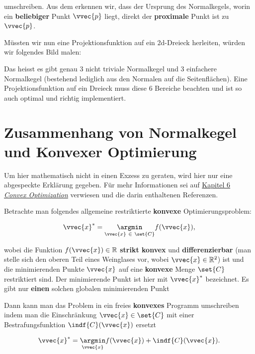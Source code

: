 \documentclass[
  12pt,
  a4paper,
  twoside,
  titlepage,
  openright,
  numbers=noenddot,
  chapterprefix=true,
  headings=optiontohead,
  svgnames,
  dvipsnames]{scrreprt}
\begin{document}
umschreiben. Aus dem erkennen wir, dass der Ursprung des Normalkegels,
worin ein \textbf{beliebiger} Punkt \(\vvec{p}\) liegt, direkt der
\textbf{proximale} Punkt ist zu \(\vvec{p}\).

Müssten wir nun eine Projektionsfunktion auf ein \(2\)d-Dreieck
herleiten, würden wir folgendes Bild malen:


Das heisst es gibt genau 3 nicht triviale Normalkegel und 3 einfachere
Normalkegel (bestehend lediglich aus den Normalen auf die
Seitenflächen). Eine Projektionsfunktion auf ein Dreieck muss diese 6
Bereiche beachten und ist so auch optimal und richtig implementiert.

\hypertarget{zusammenhang-von-normalkegel-und-konvexer-optimierung}{%
\section{Zusammenhang von Normalkegel und Konvexer
Optimierung}\label{zusammenhang-von-normalkegel-und-konvexer-optimierung}}

Um hier mathematisch nicht in einen Exzess zu geraten, wird hier nur
eine abgespeckte Erklärung gegeben. Für mehr Informationen sei auf
\href{http://dx.doi.org/10.3929/ethz-a-010662262}{Kapitel 6 \emph{Convex
Optimization}} verwiesen und die darin enthaltenen Referenzen.

Betrachte man folgendes allgemeine restriktierte \textbf{konvexe}
Optimierungsproblem:

\[\begin{align}
\vvec{x}^* = \underset{\vvec{x} \ \in \ \set{C}}{\argmin} f(\vvec{x}),
\label{eq-convexproblem}
\end{align}\]

wobei die Funktion \(f(\vvec{x}) \in \mathbb{R}\) \textbf{strikt konvex}
und \textbf{differenzierbar} (man stelle sich den oberen Teil eines
Weinglases vor, wobei \(\vvec{x} \in \mathbb{R}^2\)) ist und die
minimierenden Punkte \(\vvec{x}\) auf eine \textbf{konvexe} Menge
\(\set{C}\) restriktiert sind. Der minimierende Punkt ist hier mit
\(\vvec{x}^*\) bezeichnet. Es gibt nur \textbf{einen} solchen globalen
minimierenden Punkt

Dann kann man das Problem in ein freies \textbf{konvexes} Programm
umschreiben indem man die Einschränkung \(\vvec{x} \in \set{C}\) mit
einer Bestrafungsfunktion \(\indf{C}(\vvec{x})\) ersetzt

\[\begin{align}
\vvec{x}^* = \underset{\vvec{x}}{\argmin} f(\vvec{x}) + \indf{C}(\vvec{x}).
\end{align}\]
\end{document}
